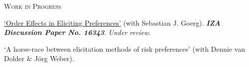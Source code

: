 \begin{rubric}{\textsc{Work in Progress}}


\entry* \href{https://docs.iza.org/dp16343.pdf}{`Order Effects in Eliciting Preferences'} (with Sebastian J. Goerg). \textbf{\textit{IZA Discussion Paper No. 16343}}. \emph{Under review.}


\entry* `A horse-race between elicitation methods of risk preferences' (with Dennie van Dolder \& J{\"o}rg Weber).

%
%
%

\end{rubric}
